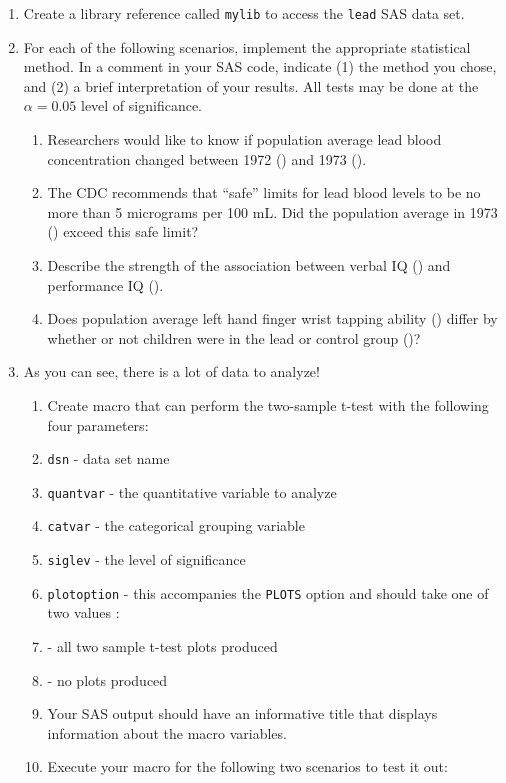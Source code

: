 \begin{enumerate}
\item Create a library reference called \texttt{mylib} to access the \texttt{lead} SAS data set.
\item
For each of the following scenarios, implement the appropriate statistical method.  In a comment in your SAS code, indicate (1) the method you chose, and (2) a brief interpretation of your results.  All tests may be done at the $\alpha=0.05$ level of significance.
\begin{enumerate}
\item Researchers would like to know if population average lead blood concentration changed between 1972 () and 1973 ().
\item The CDC recommends that ``safe'' limits for lead blood levels to be no more than 5 micrograms per 100 mL.  Did the population average in 1973 () exceed this safe limit?
\item Describe the strength of the association between verbal IQ () and performance IQ ().
\item Does population average left hand finger wrist tapping ability () differ by whether or not children were in the lead or control group ()?
\end{enumerate}
\item As you can see, there is a lot of data to analyze!
\begin{enumerate}
\item
Create macro that can perform the two-sample t-test with the following four parameters:
\bi
\item \texttt{dsn} - data set name
\item \texttt{quantvar} - the quantitative variable to analyze
\item \texttt{catvar} - the categorical grouping variable
\item \texttt{siglev} - the level of significance
\item \texttt{plotoption} - this accompanies the \texttt{PLOTS} option and should take one of two values :
\bi
\item[]  - all two sample t-test plots produced
\item[]  - no plots produced
\ei
\ei
\item Your SAS output should have an informative title that displays information about the macro variables.
\item Execute your macro for the following two scenarios to test it out:

\end{enumerate}
\end{enumerate}
